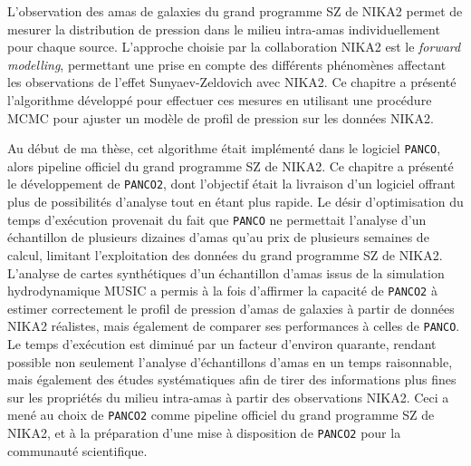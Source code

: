 L'observation des amas de galaxies du grand programme SZ de NIKA2 permet de mesurer la distribution de pression dans le milieu intra-amas individuellement pour chaque source.
L'approche choisie par la collaboration NIKA2 est le \textit{forward modelling}, permettant une prise en compte des différents phénomènes affectant les observations de l'effet Sunyaev-Zeldovich avec NIKA2.
Ce chapitre a présenté l'algorithme développé pour effectuer ces mesures en utilisant une procédure MCMC pour ajuster un modèle de profil de pression sur les données NIKA2.

Au début de ma thèse, cet algorithme était implémenté dans le logiciel \texttt{PANCO}, alors pipeline officiel du grand programme SZ de NIKA2.
Ce chapitre a présenté le développement de \texttt{PANCO2}, dont l'objectif était la livraison d'un logiciel offrant plus de possibilités d'analyse tout en étant plus rapide.
Le désir d'optimisation du temps d'exécution provenait du fait que \texttt{PANCO} ne permettait l'analyse d'un échantillon de plusieurs dizaines d'amas qu'au prix de plusieurs semaines de calcul, limitant l'exploitation des données du grand programme SZ de NIKA2.
L'analyse de cartes synthétiques d'un échantillon d'amas issus de la simulation hydrodynamique MUSIC a permis à la fois d'affirmer la capacité de \texttt{PANCO2} à estimer correctement le profil de pression d'amas de galaxies à partir de données NIKA2 réalistes, mais également de comparer ses performances à celles de \texttt{PANCO}.
Le temps d'exécution est diminué par un facteur d'environ quarante, rendant possible non seulement l'analyse d'échantillons d'amas en un temps raisonnable, mais également des études systématiques afin de tirer des informations plus fines sur les propriétés du milieu intra-amas à partir des observations NIKA2.
Ceci a mené au choix de \texttt{PANCO2} comme pipeline officiel du grand programme SZ de NIKA2, et à la préparation d'une mise à disposition de \texttt{PANCO2} pour la communauté scientifique.
